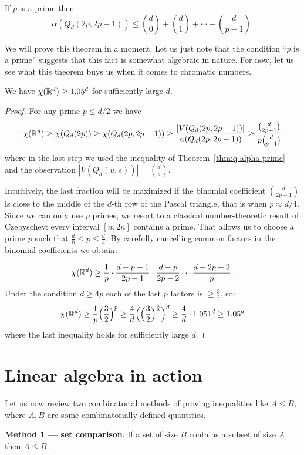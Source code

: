 \begin{theorem}
\label{thm:q-prime-alpha}
If $p$ is a prime then 
$$\alpha(Q_d(2p,2p-1))\leq {d\choose 0}+{d\choose 1}+\cdots+{d\choose p-1}.$$
\end{theorem}

We will prove this theorem in a moment. Let us just note that the condition ``$p$ is a prime'' suggests that this fact is somewhat algebraic in nature. For now, let us see what this theorem buys us when it comes to chromatic numbers.

\begin{theorem}
We have $\chi(\mathbb{R}^d)\geq 1.05^d$ for sufficiently large $d$.
\end{theorem}
\begin{proof}
For any prime $p\leq d/2$ we have
$$\chi(\mathbb{R}^d)\geq\chi(Q_d(2p))\geq\chi(Q_d(2p,2p-1))\geq
\frac{|V(Q_d(2p,2p-1))|}{\alpha(Q_d(2p,2p-1))}\geq \frac{{d\choose 2p-1}}{p{d\choose p-1}}$$
where in the last step we used the inequality of Theorem~\ref{thm:q-alpha-prime} and the observation $|V(Q_d(u,s))|={d\choose s}$.

Intuitively, the last fraction will be maximized if the binomial coefficient ${d\choose 2p-1}$ is close to the middle of the $d$-th row of the Pascal triangle, that is when $p\approx d/4$. Since we can only use $p$ primes, we resort to a classical number-theoretic result of Czebyschev: every interval $[n,2n]$ contains a prime. That allows us to choose a prime $p$ such that $\frac{d}{8}\leq p\leq \frac{d}{4}$. By carefully cancelling common factors in the binomial coefficients we obtain:

$$\chi(\mathbb{R}^d)\geq \frac{1}{p}\cdot\frac{d-p+1}{2p-1}\cdot\frac{d-p}{2p-2}\cdots\frac{d-2p+2}{p}.$$
Under the condition $d\geq 4p$ each of the last $p$ factors is $\geq \frac{3}{2}$, so:
$$\chi(\mathbb{R}^d)\geq\frac{1}{p}\Big(\frac{3}{2}\Big)^p\geq\frac{4}{d}\Big(\Big(\frac{3}{2}\Big)^{\frac{1}{8}}\Big)^d\geq \frac{4}{d}\cdot 1.051^d\geq 1.05^d$$
where the last inequality holds for sufficiently large $d$.
\end{proof}

\section{Linear algebra in action}
Let us now review two combinatorial methods of proving inequalities like $A\leq B$, where $A, B$ are some combinatorially defined quantities.

\smallskip
\noindent
\textbf{Method 1 --- set comparison}. If a set of size $B$ contains a subset of size $A$ then $A\leq B$.

